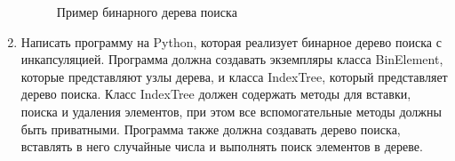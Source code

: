 \begin{enumerate}
\begin{figure}[h]
\centering
{}
\caption{Пример бинарного дерева поиска}
\end{figure}

\item Написать программу на Python, которая реализует бинарное дерево поиска с инкапсуляцией. Программа должна создавать экземпляры класса BinElement, которые представляют узлы дерева, и класса IndexTree, который представляет дерево поиска. Класс IndexTree должен содержать методы для вставки, поиска и удаления элементов, при этом все вспомогательные методы должны быть приватными. Программа также должна создавать дерево поиска, вставлять в него случайные числа и выполнять поиск элементов в дереве.


\end{enumerate}
